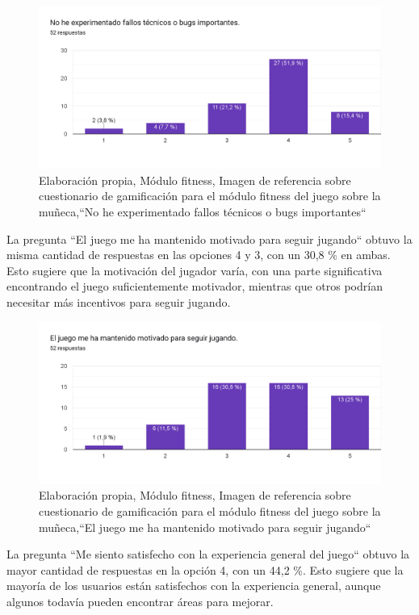     \begin{figure}[H]
  \centering
  \includegraphics[width=0.7\linewidth]{Imagenes/fc8.png}
  \caption{Elaboración propia, Módulo fitness, Imagen de referencia sobre cuestionario  de gamificación para el módulo fitness del juego sobre la muñeca,``No he experimentado fallos técnicos o bugs importantes``}
  \label{fig:cuestionario8fitness}
\end{figure}

La pregunta ``El juego me ha mantenido motivado para seguir jugando`` obtuvo la misma cantidad de respuestas en las opciones 4 y 3, con un 30,8 \% en ambas. Esto sugiere que la motivación del jugador varía, con una parte significativa encontrando el juego suficientemente motivador, mientras que otros podrían necesitar más incentivos para seguir jugando.

    \begin{figure}[H]
  \centering
  \includegraphics[width=0.7\linewidth]{Imagenes/fc9.png}
  \caption{Elaboración propia, Módulo fitness, Imagen de referencia sobre cuestionario  de gamificación para el módulo fitness del juego sobre la muñeca,``El juego me ha mantenido motivado para seguir jugando`` }
  \label{fig:cuestionario9fitness}
\end{figure}


La pregunta ``Me siento satisfecho con la experiencia general del juego`` obtuvo la mayor cantidad de respuestas en la opción 4, con un 44,2 \%. Esto sugiere que la mayoría de los usuarios están satisfechos con la experiencia general, aunque algunos todavía pueden encontrar áreas para mejorar.


